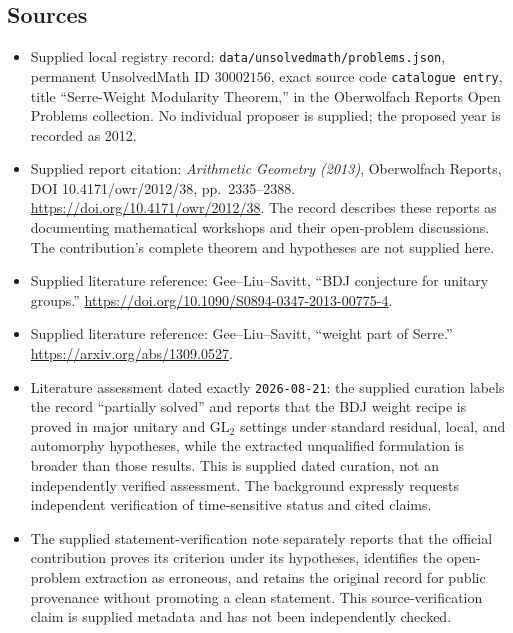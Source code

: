 \documentclass[11pt]{article}
\begin{document}
\subsection{Sources}
\begin{itemize}
\item Supplied local registry record: \texttt{data/unsolvedmath/problems.json}, permanent UnsolvedMath ID \(30002156\), exact source code \texttt{catalogue entry}, title ``Serre-Weight Modularity Theorem,'' in the Oberwolfach Reports Open Problems collection. No individual proposer is supplied; the proposed year is recorded as 2012.
\item Supplied report citation: \emph{Arithmetic Geometry (2013)}, Oberwolfach Reports, DOI 10.4171/owr/2012/38, pp.\ 2335--2388. \url{https://doi.org/10.4171/owr/2012/38}. The record describes these reports as documenting mathematical workshops and their open-problem discussions. The contribution's complete theorem and hypotheses are not supplied here.
\item Supplied literature reference: Gee--Liu--Savitt, ``BDJ conjecture for unitary groups.'' \url{https://doi.org/10.1090/S0894-0347-2013-00775-4}.
\item Supplied literature reference: Gee--Liu--Savitt, ``weight part of Serre.'' \url{https://arxiv.org/abs/1309.0527}.
\item Literature assessment dated exactly \texttt{2026-08-21}: the supplied curation labels the record ``partially solved'' and reports that the BDJ weight recipe is proved in major unitary and \(\mathrm{GL}_2\) settings under standard residual, local, and automorphy hypotheses, while the extracted unqualified formulation is broader than those results. This is supplied dated curation, not an independently verified assessment. The background expressly requests independent verification of time-sensitive status and cited claims.
\item The supplied statement-verification note separately reports that the official contribution proves its criterion under its hypotheses, identifies the open-problem extraction as erroneous, and retains the original record for public provenance without promoting a clean statement. This source-verification claim is supplied metadata and has not been independently checked.
\end{itemize}
\end{document}
